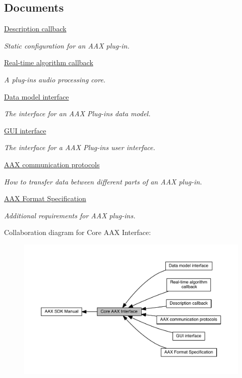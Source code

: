 \subsection*{Documents}
\begin{DoxyCompactItemize}
\item 
\hyperlink{a00326}{Description callback}
\begin{DoxyCompactList}\small\item\em Static configuration for an A\+A\+X plug-\/in. \end{DoxyCompactList}\item 
\hyperlink{a00327}{Real-\/time algorithm callback}
\begin{DoxyCompactList}\small\item\em A plug-\/in\textquotesingle{}s audio processing core. \end{DoxyCompactList}\item 
\hyperlink{a00328}{Data model interface}
\begin{DoxyCompactList}\small\item\em The interface for an A\+A\+X Plug-\/in\textquotesingle{}s data model. \end{DoxyCompactList}\item 
\hyperlink{a00329}{G\+U\+I interface}
\begin{DoxyCompactList}\small\item\em The interface for a A\+A\+X Plug-\/in\textquotesingle{}s user interface. \end{DoxyCompactList}\item 
\hyperlink{a00330}{A\+A\+X communication protocols}
\begin{DoxyCompactList}\small\item\em How to transfer data between different parts of an A\+A\+X plug-\/in. \end{DoxyCompactList}\item 
\hyperlink{a00331}{A\+A\+X Format Specification}
\begin{DoxyCompactList}\small\item\em Additional requirements for A\+A\+X plug-\/ins. \end{DoxyCompactList}\end{DoxyCompactItemize}
Collaboration diagram for Core A\+A\+X Interface\+:
\nopagebreak
\begin{figure}[H]
\begin{center}
\leavevmode
\includegraphics[width=350pt]{a00325}
\end{center}
\end{figure}
